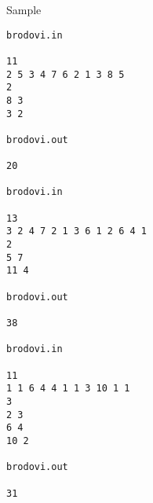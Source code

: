Sample
\begin{verbatim}
brodovi.in 
 
11 
2 5 3 4 7 6 2 1 3 8 5 
2 
8 3 
3 2 
 
brodovi.out 
 
20 

brodovi.in 
 
13 
3 2 4 7 2 1 3 6 1 2 6 4 1 
2 
5 7 
11 4 
 
brodovi.out 
 
38

brodovi.in 
 
11 
1 1 6 4 4 1 1 3 10 1 1 
3 
2 3 
6 4 
10 2 
 
brodovi.out 
 
31 
\end{verbatim}